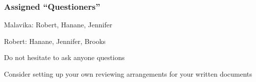 \documentclass[t,12pt,numbers,fleqn]{beamer}
\begin{document}

\begin{frame}
\frametitle{Assigned ``Questioners''}

\be
\item Malavika: Robert, Hanane, Jennifer
\item Robert: Hanane, Jennifer, Brooks
\ee
\bi
\item Do not hesitate to ask anyone questions
\item Consider setting up your own reviewing arrangements for your written
  documents
\ei
\end{frame}

\end{document}
